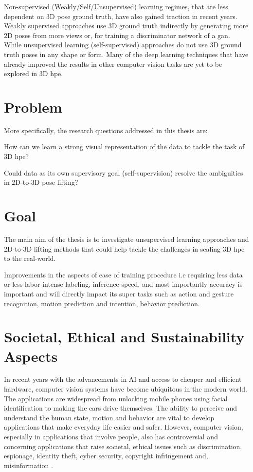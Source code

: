 Non-supervised (Weakly/Self/Unsupervised) learning regimes, that are less dependent on 3D pose ground truth, have also gained traction in recent years. Weakly supervised approaches use 3D ground truth indirectly by generating more 2D poses from more views or, for training a discriminator network of a \ac{gan}. While unsupervised learning (self-supervised) approaches do not use 3D ground truth poses in any shape or form. Many of the deep learning techniques that have already improved the results in other computer vision tasks are yet to be explored in 3D \ac{hpe}. 

\section{Problem}
\label{sec:problem}
More specifically, the research questions addressed in this thesis are: 
\begin{compactenum}
\item How can we learn a strong visual representation of the data to tackle the task of 3D \ac{hpe}?
\item Could data as its own supervisory goal (self-supervision) resolve the ambiguities in 2D-to-3D pose lifting?
\end{compactenum}

\section{Goal}
\label{sec:goal}
The main aim of the thesis is to investigate unsupervised learning approaches and 2D-to-3D lifting methods that could help tackle the challenges in scaling 3D \ac{hpe} to the real-world.

Improvements in the aspects of ease of training procedure i.e requiring less data or less labor-intense labeling, inference speed, and most importantly accuracy is important and will directly impact its super tasks such as action and gesture recognition, motion prediction and intention, behavior prediction.

\section{Societal, Ethical and Sustainability Aspects}
In recent years with the advancements in AI and access to cheaper and efficient hardware, computer vision systems have become ubiquitous in the modern world. The applications are widespread from unlocking mobile phones using facial identification to making the cars drive themselves. The ability to perceive and understand the human state, motion and behavior are vital to develop applications that make everyday life easier and safer. However, computer vision, especially in applications that involve people, also has controversial and concerning applications that raise societal, ethical issues such as discrimination, espionage, identity theft, cyber security, copyright infringement and, misinformation \cite{ethical_issues}.

